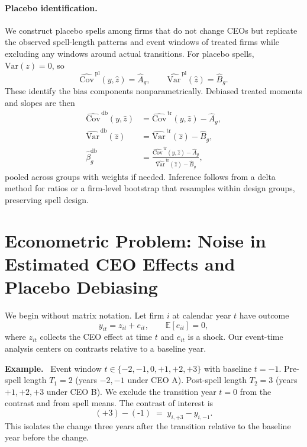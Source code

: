 \documentclass[11pt,a4paper]{article}
\newcommand{\Var}{\text{Var}}
\newcommand{\Cov}{\text{Cov}}
\begin{document}
\paragraph{Placebo identification.} We construct placebo spells among firms that do not change CEOs but replicate the observed spell-length patterns and event windows of treated firms while excluding any windows around actual transitions. For placebo spells, $\Var(z)=0$, so
\begin{equation}
\widehat{\Cov}^{\,\text{pl}}(y,\hat z)=\hat A_g,\qquad \widehat{\Var}^{\,\text{pl}}(\hat z)=\hat B_g.
\end{equation}
These identify the bias components nonparametrically. Debiased treated moments and slopes are then
\begin{align}
\widehat{\Cov}^{\,\text{db}}(y,\hat z) &= \widehat{\Cov}^{\,\text{tr}}(y,\hat z) - \hat A_g,\\
\widehat{\Var}^{\,\text{db}}(\hat z) &= \widehat{\Var}^{\,\text{tr}}(\hat z) - \hat B_g,\\
\hat\beta^{\text{db}}_g &= \frac{\widehat{\Cov}^{\,\text{tr}}(y,\hat z)-\hat A_g}{\widehat{\Var}^{\,\text{tr}}(\hat z)-\hat B_g},
\end{align}
pooled across groups with weights if needed. Inference follows from a delta method for ratios or a firm-level bootstrap that resamples within design groups, preserving spell design.

\section{Econometric Problem: Noise in Estimated CEO Effects and Placebo Debiasing}

We begin without matrix notation. Let firm $i$ at calendar year $t$ have outcome
\begin{equation}
  y_{it} = z_{it} + e_{it},\qquad \mathbb E[e_{it}]=0,
\end{equation}
where $z_{it}$ collects the CEO effect at time $t$ and $e_{it}$ is a shock. Our event-time analysis centers on contrasts relative to a baseline year.

\newenvironment{Example}{\par\noindent\textbf{Example.}\ }{\par}

\begin{Example}
Event window $t\in\{-2,-1,0,+1,+2,+3\}$ with baseline $t=-1$. Pre-spell length $T_1=2$ (years $-2,-1$ under CEO A). Post-spell length $T_2=3$ (years $+1,+2,+3$ under CEO B). We exclude the transition year $t=0$ from the contrast and from spell means. The contrast of interest is
\[
  (\text{+3}) - (\text{-1})\;=\; y_{i,+3} - y_{i,-1}.
\]
This isolates the change three years after the transition relative to the baseline year before the change.
\end{Example}
\end{document}
